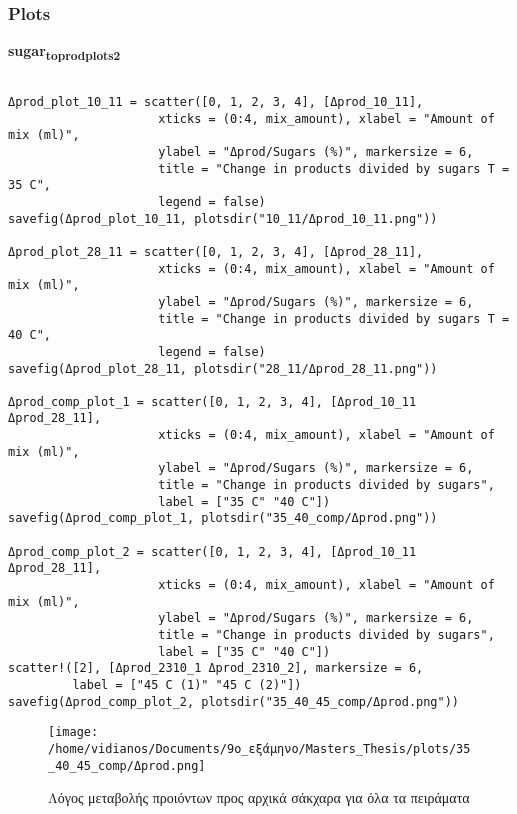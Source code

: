 \documentclass[11pt]{article}
\begin{document}
\subsubsection{Plots}
\label{sec:orgeb9d6a4}
\textbf{sugar\textsubscript{to}\textsubscript{prod}\textsubscript{plots}\textsubscript{2}}
\begin{verbatim}

Δprod_plot_10_11 = scatter([0, 1, 2, 3, 4], [Δprod_10_11],
                     xticks = (0:4, mix_amount), xlabel = "Amount of mix (ml)",
                     ylabel = "Δprod/Sugars (%)", markersize = 6,
                     title = "Change in products divided by sugars T = 35 C",
                     legend = false)
savefig(Δprod_plot_10_11, plotsdir("10_11/Δprod_10_11.png"))

Δprod_plot_28_11 = scatter([0, 1, 2, 3, 4], [Δprod_28_11],
                     xticks = (0:4, mix_amount), xlabel = "Amount of mix (ml)",
                     ylabel = "Δprod/Sugars (%)", markersize = 6,
                     title = "Change in products divided by sugars T = 40 C",
                     legend = false)
savefig(Δprod_plot_28_11, plotsdir("28_11/Δprod_28_11.png"))

Δprod_comp_plot_1 = scatter([0, 1, 2, 3, 4], [Δprod_10_11 Δprod_28_11],
                     xticks = (0:4, mix_amount), xlabel = "Amount of mix (ml)",
                     ylabel = "Δprod/Sugars (%)", markersize = 6,
                     title = "Change in products divided by sugars",
                     label = ["35 C" "40 C"])
savefig(Δprod_comp_plot_1, plotsdir("35_40_comp/Δprod.png"))

Δprod_comp_plot_2 = scatter([0, 1, 2, 3, 4], [Δprod_10_11 Δprod_28_11],
                     xticks = (0:4, mix_amount), xlabel = "Amount of mix (ml)",
                     ylabel = "Δprod/Sugars (%)", markersize = 6,
                     title = "Change in products divided by sugars",
                     label = ["35 C" "40 C"])
scatter!([2], [Δprod_2310_1 Δprod_2310_2], markersize = 6,
         label = ["45 C (1)" "45 C (2)"])
savefig(Δprod_comp_plot_2, plotsdir("35_40_45_comp/Δprod.png"))
\end{verbatim}

\begin{figure}[htbp]
\centering
\texttt{[image: /home/vidianos/Documents/9o\_εξάμηνο/Masters\_Thesis/plots/35\_40\_45\_comp/Δprod.png]}
\caption{Λόγος μεταβολής προιόντων προς αρχικά σάκχαρα για όλα τα πειράματα}
\end{figure}
\end{document}
